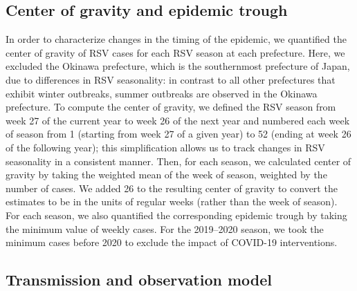 \documentclass[12pt]{article}
\begin{document}
\subsection*{Center of gravity and epidemic trough}

In order to characterize changes in the timing of the epidemic, we quantified the center of gravity of RSV cases for each RSV season at each prefecture.
Here, we excluded the Okinawa prefecture, which is the southernmost prefecture of Japan, due to differences in RSV seasonality:
in contrast to all other prefectures that exhibit winter outbreaks, summer outbreaks are observed in the Okinawa prefecture.
To compute the center of gravity, we defined the RSV season from week 27 of the current year to week 26 of the next year and numbered each week of season from 1 (starting from week 27 of a given year) to 52 (ending at week 26 of the following year);
this simplification allows us to track changes in RSV seasonality in a consistent manner.
Then, for each season, we calculated center of gravity by taking the weighted mean of the week of season, weighted by the number of cases.
We added 26 to the resulting center of gravity to convert the estimates to be in the units of regular weeks (rather than the week of season).
For each season, we also quantified the corresponding epidemic trough by taking the minimum value of weekly cases.
For the 2019--2020 season, we took the minimum cases before 2020 to exclude the impact of COVID-19 interventions.

\subsection*{Transmission and observation model}
\end{document}
